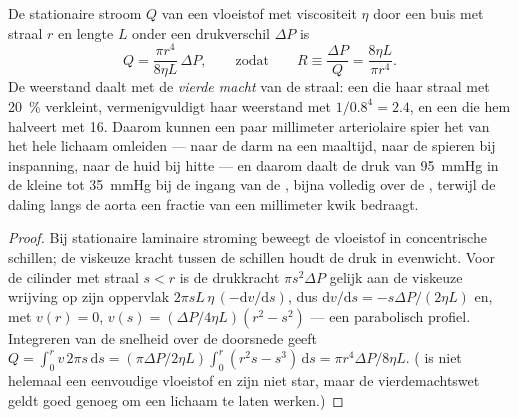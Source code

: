 \begin{theorem}\label{thm:b2:blood-circulation:poiseuille}
De stationaire stroom $Q$ van een vloeistof met viscositeit $\eta$ door een
buis met straal $r$ en lengte $L$ onder een drukverschil $\Delta P$
is
\[
Q = \frac{\pi r^{4}}{8\eta L}\,\Delta P, \qquad \text{zodat}\qquad
R \equiv \frac{\Delta P}{Q} = \frac{8\eta L}{\pi r^{4}} .
\]
De weerstand daalt met de \emph{vierde macht} van de straal: een 
die haar straal met \qty{20}{\%} verkleint, vermenigvuldigt haar weerstand
met $1/0.8^{4} = 2.4$, en een die hem halveert met 16. Daarom kunnen een
paar millimeter arteriolaire spier het  van het hele lichaam omleiden
--- naar de darm na een maaltijd, naar de spieren bij inspanning, naar de
huid bij hitte --- en daarom daalt de druk van \qty{95}{mmHg} in de kleine
 tot \qty{35}{mmHg} bij de ingang van de , bijna volledig
over de , terwijl de daling langs de aorta een fractie van een
millimeter kwik bedraagt.
\end{theorem}
\begin{proof}
Bij stationaire laminaire stroming beweegt de vloeistof in concentrische
schillen; de viskeuze kracht tussen de schillen houdt de druk in evenwicht.
Voor de cilinder met straal $s < r$ is de drukkracht $\pi s^{2}\Delta P$
gelijk aan de viskeuze wrijving op zijn oppervlak $2\pi s L\,\eta\,(-\mathrm{d}v/
\mathrm{d}s)$, dus $\mathrm{d}v/\mathrm{d}s = -s\Delta P/(2\eta L)$
en, met $v(r) = 0$, $v(s) = (\Delta P/4\eta L)(r^{2} - s^{2})$ --- een
parabolisch profiel. Integreren van de snelheid over de doorsnede geeft
$Q = \int_{0}^{r} v\,2\pi s\,\mathrm{d}s = (\pi\Delta P/2\eta L)
\int_{0}^{r}(r^{2}s - s^{3})\,\mathrm{d}s = \pi r^{4}\Delta P/8\eta
L$. ( is niet helemaal een eenvoudige vloeistof en  zijn niet
star, maar de vierdemachtswet geldt goed genoeg om een lichaam te laten
werken.)
\end{proof}

